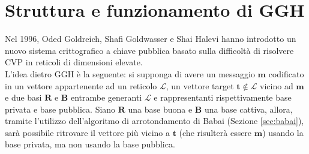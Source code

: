 \section{Struttura e funzionamento di GGH}
\label{sec:gghintroduction}
Nel 1996, Oded Goldreich, Shafi Goldwasser e Shai Halevi\cite{GGH97} hanno introdotto un nuovo 
sistema crittografico a chiave pubblica basato sulla difficoltà di risolvere CVP in reticoli
di dimensioni elevate. 
\\
L'idea dietro GGH è la seguente: si supponga di avere un messaggio $\mathbf{m}$ 
codificato in un vettore appartenente ad un reticolo $\mathcal{L}$, un vettore target 
$\mathbf{t} \notin \mathcal{L}$ vicino ad $\mathbf{m}$ e
due basi $\mathbf{R}$ e $\mathbf{B}$ entrambe generanti $\mathcal{L}$
e rappresentanti rispettivamente base privata e base pubblica. 
Siano $\mathbf{R}$ una base buona e $\mathbf{B}$ una base cattiva, allora, tramite l'utilizzo
dell'algoritmo di arrotondamento di Babai (Sezione \ref*{sec:babai}), sarà possibile ritrovare
il vettore più vicino a $\mathbf{t}$ (che risulterà essere $\mathbf{m}$) usando la base privata,
ma non usando la base pubblica.

